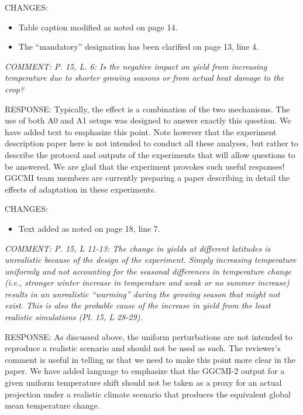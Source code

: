 \documentclass[gmd, manuscript]{copernicus} %
\begin{document}
CHANGES:
\begin{itemize}
    \item Table caption modified as noted on page 14.
    \item The ``mandatory'' designation has been clarified on page 13, line 4. 
\end{itemize}

\smallskip

\textcolor{dark-gray}{\textit{COMMENT: P. 15, L. 6: Is the negative impact on yield from increasing temperature due to shorter growing seasons or from actual heat damage to the crop?}}

RESPONSE: Typically, the effect is a combination of the two mechanisms. The use of both A0 and A1 setups was designed to answer exactly this question. We have added text to emphasize this point. Note however that the experiment description paper here is not intended to conduct all these analyses, but rather to describe the protocol and outputs of the experiments that will allow questions to be answered. We are glad that the experiment provokes such useful responses! GGCMI team members are currently preparing a paper describing in detail the effects of adaptation in these experiments.
\smallskip

CHANGES:
\begin{itemize}
    \item Text added as noted on page 18, line 7.
\end{itemize}

\smallskip

\textcolor{dark-gray}{\textit{COMMENT: P. 15, L 11-13: The change in yields at different latitudes is unrealistic because of the design of the experiment. Simply increasing temperature uniformly and not accounting for the seasonal differences in temperature change (i.e., stronger winter increase in temperature and weak or no summer increase) results in an unrealistic “warming” during the growing season that might not exist. This is also the probable cause of the increase in yield from the least realistic simulations (Pl. 15, L 28-29).}}

RESPONSE: As discussed above, the uniform perturbations are not intended to reproduce a realistic scenario and should not be used as such. The reviewer’s comment is useful in telling us that we need to make this point more clear in the paper. We have added language to emphasize that the GGCMI-2 output for a given uniform temperature shift should not be taken as a proxy for an actual projection under a realistic climate scenario that produces the equivalent global mean temperature change. 
\end{document}
